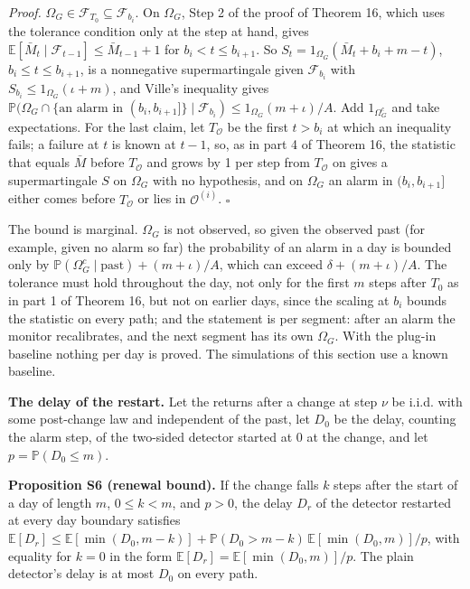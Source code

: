 \documentclass[
]{article}
\begin{document}
\emph{Proof.}
\(\Omega_G \in \mathcal{F}_{T_0} \subseteq \mathcal{F}_{b_i}\). On
\(\Omega_G\), Step 2 of the proof of Theorem 16, which uses the
tolerance condition only at the step at hand, gives
\(\mathbb{E}[\bar M_t \mid \mathcal{F}_{t-1}] \le \bar M_{t-1} + 1\) for
\(b_i < t \le b_{i+1}\). So
\(S_t = 1_{\Omega_G}(\bar M_t + b_i + m - t)\),
\(b_i \le t \le b_{i+1}\), is a nonnegative supermartingale given
\(\mathcal{F}_{b_i}\) with \(S_{b_i} \le 1_{\Omega_G}(\iota + m)\), and
Ville's inequality gives
\(\mathbb{P}(\Omega_G \cap \lbrace \text{an alarm in } (b_i, b_{i+1}]\rbrace \mid \mathcal{F}_{b_i}) \le 1_{\Omega_G}(m + \iota)/A\).
Add \(1_{\Omega_G^c}\) and take expectations. For the last claim, let
\(T_{\mathcal{O}}\) be the first \(t > b_i\) at which an inequality
fails; a failure at \(t\) is known at \(t - 1\), so, as in part 4 of
Theorem 16, the statistic that equals \(\bar M\) before
\(T_{\mathcal{O}}\) and grows by 1 per step from \(T_{\mathcal{O}}\) on
gives a supermartingale \(S\) on \(\Omega_G\) with no hypothesis, and on
\(\Omega_G\) an alarm in \((b_i, b_{i+1}]\) either comes before
\(T_{\mathcal{O}}\) or lies in \(\mathcal{O}^{(i)}\). \(\square\)

The bound is marginal. \(\Omega_G\) is not observed, so given the
observed past (for example, given no alarm so far) the probability of an
alarm in a day is bounded only by
\(\mathbb{P}(\Omega_G^c \mid \text{past}) + (m + \iota)/A\), which can
exceed \(\delta + (m + \iota)/A\). The tolerance must hold throughout
the day, not only for the first \(m\) steps after \(T_0\) as in part 1
of Theorem 16, but not on earlier days, since the scaling at \(b_i\)
bounds the statistic on every path; and the statement is per segment:
after an alarm the monitor recalibrates, and the next segment has its
own \(\Omega_G\). With the plug-in baseline nothing per day is proved.
The simulations of this section use a known baseline.

\textbf{The delay of the restart.} Let the returns after a change at
step \(\nu\) be i.i.d. with some post-change law and independent of the
past, let \(D_0\) be the delay, counting the alarm step, of the
two-sided detector started at 0 at the change, and let
\(p = \mathbb{P}(D_0 \le m)\).

\textbf{Proposition S6 (renewal bound).} If the change falls \(k\) steps
after the start of a day of length \(m\), \(0 \le k < m\), and
\(p > 0\), the delay \(D_r\) of the detector restarted at every day
boundary satisfies
\(\mathbb{E}[D_r] \le \mathbb{E}[\min(D_0, m - k)] + \mathbb{P}(D_0 > m - k)\,\mathbb{E}[\min(D_0, m)]/p\),
with equality for \(k = 0\) in the form
\(\mathbb{E}[D_r] = \mathbb{E}[\min(D_0, m)]/p\). The plain detector's
delay is at most \(D_0\) on every path.
\end{document}
